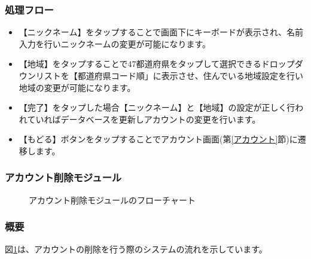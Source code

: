 \documentclass[a4j]{jarticle}
\begin{document}
\subsubsection*{処理フロー}
\begin{itemize}
\item 【ニックネーム】をタップすることで画面下にキーボードが表示され、名前入力を行いニックネームの変更が可能になります。
\item 【地域】をタップすることで47都道府県をタップして選択できるドロップダウンリストを【都道府県コード順」に表示させ、住んでいる地域設定を行い地域の変更が可能になります。
\item 【完了】をタップした場合【ニックネーム】と【地域】の設定が正しく行われていればデータベースを更新しアカウントの変更を行います。
\item 【もどる】ボタンをタップすることでアカウント画面(第\ref{アカウント}節)に遷移します。
\end{itemize}

\subsubsection{アカウント削除モジュール\label{アカウント削除}} %
\begin{figure}[H]
    \begin{center}
    \caption {アカウント削除モジュールのフローチャート}
    \label{設定_アカウント削除}
    \end{center}
\end{figure}
\subsubsection*{概要}
	図\ref{設定_アカウント削除}は、アカウントの削除を行う際のシステムの流れを示しています。
\end{document}
